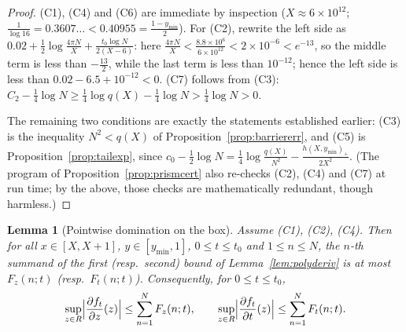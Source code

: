 \documentclass[11pt]{article}
\newtheorem{lemma}[theorem]{Lemma}
\theoremstyle{definition}
\begin{document}
\begin{proof}
(C1), (C4) and (C6) are immediate by inspection
($X\approx6\times10^{12}$;
$\frac1{\log16}=0.3607\ldots<0.40955=\frac{1-y_{\min}}2$). For
(C2), rewrite the left side as
$0.02+\frac12\log\frac{4\pi N}{X}
+\frac{t_0\log N}{2(X-6)}$: here
$\frac{4\pi N}{X}<\frac{8.8\times10^6}{6\times10^{12}}
<2\times10^{-6}<e^{-13}$, so the middle term is less than
$-\frac{13}2$, while the last term is less than $10^{-12}$; hence
the left side is less than $0.02-6.5+10^{-12}<0$. (C7) follows
from (C3): $C_2-\frac14\log N\ge\frac14\log q(X)-\frac14\log N
>\frac14\log N>0$.

The remaining two conditions are exactly the statements
established earlier: (C3) is the inequality $N^2<q(X)$ of
Proposition~\ref{prop:barriererr}, and (C5) is
Proposition~\ref{prop:tailexp}, since
$c_0-\frac12\log N
=\frac14\log\frac{q(X)}{N^2}-\frac{h(X,y_{\min})_+}{2X^2}$.
(The program of Proposition~\ref{prop:prismcert} also re-checks
(C2), (C4) and (C7) at run
time; by the above, those checks are mathematically redundant,
though harmless.)
\end{proof}

\begin{lemma}[Pointwise domination on the box]\label{lem:dompoint}
Assume (C1), (C2), (C4). Then for all $x\in[X,X+1]$,
$y\in[y_{\min},1]$, $0\le t\le t_0$ and $1\le n\le N$, the $n$-th
summand of the first (resp.\ second) bound of
Lemma~\ref{lem:polyderiv} is at most $F_z(n;t)$ (resp.\
$F_t(n;t)$). Consequently, for $0\le t\le t_0$,
\[
\sup_{z\in R}\Bigl|\frac{\partial f_t}{\partial z}(z)\Bigr|
\le\sum_{n=1}^{N}F_z(n;t),
\qquad
\sup_{z\in R}\Bigl|\frac{\partial f_t}{\partial t}(z)\Bigr|
\le\sum_{n=1}^{N}F_t(n;t).
\]
\end{lemma}
\end{document}

